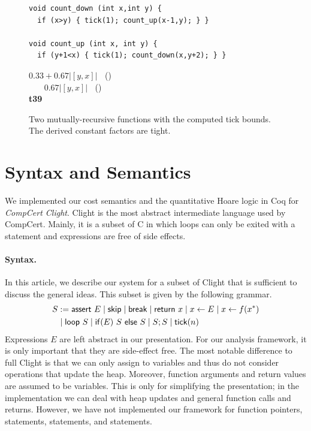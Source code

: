 \documentclass[nocopyrightspace,preprint]{sigplanconf}
\newcommand{\ifshort}[2]{\ifx\fullversion\undefined{#1}\else{#2}\fi}
\newcommand{\sectskip}[0]{\ifshort{\vspace{-3pt}}{}}
\newcommand{\aftersectskip}[0]{\ifshort{\vspace{-1pt}}{}}
\begin{document}
\begin{figure}[t]
  \centering
    \begin{minipage}[b]{\linewidth}
    \begin{center}
   \begin{lstlisting}
void count_down (int x,int y) {
  if (x>y) { tick(1); count_up(x-1,y); } }

void count_up (int x, int y) {
  if (y+1<x) { tick(1); count_down(x,y+2); } }

   \end{lstlisting}

$0.33 + 0.67 |[y,x]|\;\;$ ()\\
$\;\;\;\;\;\;\,0.67 |[y,x]|\;\;$ ()
\\[.4\baselineskip]
      {\bf t39}
    \end{center}
  \end{minipage}
\vspace{-1.5ex}

  \caption{Two mutually-recursive functions with the computed tick bounds.  The derived constant factors are tight.}
  \label{fig:ex_rec}
\end{figure}


\sectskip
\section{Syntax and Semantics}
\label{sec:sem}
\aftersectskip

We implemented our cost semantics and the quantitative Hoare logic in
Coq for \emph{CompCert Clight}.  Clight is the most abstract
intermediate language used by CompCert.  Mainly, it is a subset of C
in which loops can only be exited with a  statement and
expressions are free of side effects.

\paragraph{Syntax.}

In this article, we describe our system for a subset of Clight that is
sufficient to discuss the general ideas.  This subset is given by the
following grammar.
%
\begin{align*}
S &:= \mathsf{assert}~E
\mid \mathsf{skip}
\mid \mathsf{break}
\mid \mathsf{return}~x
\mid x \gets E
\mid x \gets f(x^*)
\\
& \mid \mathsf{loop}~S
\mid \mathsf{if}(E)~S~\mathsf{else}~S
\mid S;S
\mid \mathsf{tick}(n)
\end{align*}
%
Expressions $E$ are left abstract in our presentation.  For our
analysis framework, it is only important that they are side-effect
free.
%
The most notable difference to full Clight is that we can only assign
to variables and thus do not consider operations that update the heap.
Moreover, function arguments and return values are assumed to be
variables.  This is only for simplifying the presentation; in the
implementation we can deal with heap updates and general function
calls and returns.  However, we have not implemented our framework for function
pointers,  statements,  statements, and
 statements.
\end{document}
